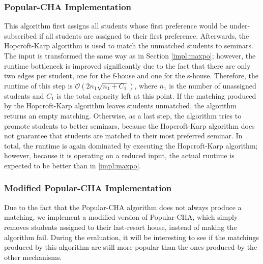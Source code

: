\subsubsection{Popular-CHA Implementation}
This algorithm first assigns all students whose first preference would be under-subscribed if all students are assigned to their first preference. Afterwards, the Hopcroft-Karp algorithm is used to match the unmatched students to seminars. The input is transformed the same way as in Section \ref{impl:maxpo}; however, the runtime bottleneck is improved significantly due to the fact that there are only two edges per student, one for the f-house and one for the s-house. Therefore, the runtime of this step is $\mathcal{O}(2n_1\sqrt{n_1+C_1})$, where $n_1$ is the number of unassigned students and $C_1$ is the total capacity left at this point. If the matching produced by the Hopcroft-Karp algorithm leaves students unmatched, the algorithm returns an empty matching. Otherwise, as a last step, the algorithm tries to promote students to better seminars, because the Hopcroft-Karp algorithm does not guarantee that students are matched to their most preferred seminar. In total, the runtime is again dominated by executing the Hopcroft-Karp algorithm; however, because it is operating on a reduced input, the actual runtime is expected to be better than in \ref{impl:maxpo}.

\subsubsection{Modified Popular-CHA Implementation}\label{impl:mod-max-pop}
Due to the fact that the Popular-CHA algorithm does not always produce a matching, we implement a modified version of Popular-CHA, which simply removes students assigned to their last-resort house, instead of making the algorithm fail. During the evaluation, it will be interesting to see if the matchings produced by this algorithm are still more popular than the ones produced by the other mechanisms.

